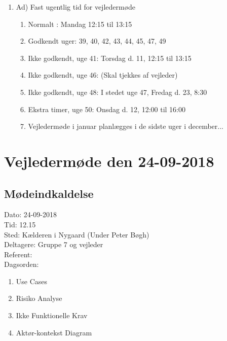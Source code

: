 \documentclass[12pt]{article}
\begin{document}
\begin{enumerate}
    \item Ad) Fast ugentlig tid for vejledermøde
    \begin{enumerate}
        \item Normalt : Mandag 12:15 til 13:15 
        \item Godkendt uger: 39, 40, 42, 43, 44, 45, 47, 49
        \item Ikke godkendt, uge 41:  Torsdag d. 11, 12:15 til 13:15 
        \item Ikke godkendt, uge 46:  (Skal tjekkes af vejleder) 
        \item Ikke godkendt, uge 48:  I stedet uge 47, Fredag d. 23, 8:30 
        \item Ekstra timer,  uge 50:  Onsdag d. 12, 12:00 til 16:00   
        \item Vejledermøde i januar planlægges i de sidste uger i december...
    \end{enumerate}

    
 \end{enumerate}

\newpage
\section{Vejledermøde den 24-09-2018}
\subsection{Mødeindkaldelse}
Dato: 24-09-2018
\\Tid: 12.15
\\Sted: Kælderen i Nygaard (Under Peter Bøgh)
\\Deltagere: Gruppe 7 og vejleder
\\Referent: 
\\Dagsorden:
\begin{enumerate}
    \item Use Cases
    \item Risiko Analyse
    \item Ikke Funktionelle Krav
    \item Aktør-kontekst Diagram
\end{enumerate}
\end{document}
